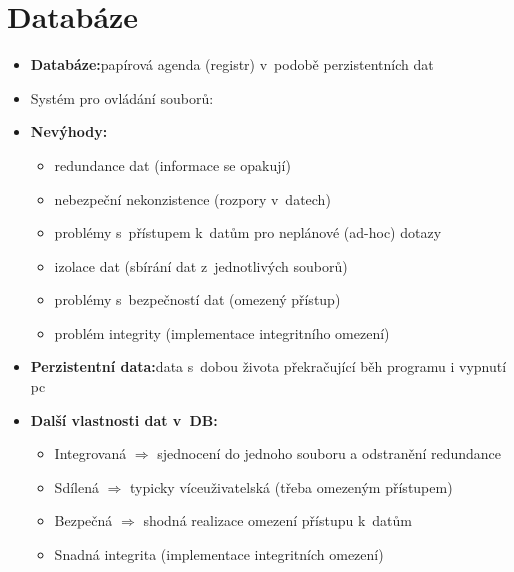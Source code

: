 \documentclass[a4paper,10pt]{article}
\newcommand{\pojem}[2]{\item \textbf{#1:}\quad #2}
\newcommand{\tedy}{$\Rightarrow$ }
\begin{document}
  \section{Databáze}
    \begin{itemize}
      \pojem{Databáze}{papírová agenda (registr) v~podobě perzistentních dat}
      \item Systém pro ovládání souborů:
      \pojem{Nevýhody}
      \begin{itemize}
        \item redundance dat (informace se opakují)
        \item nebezpeční nekonzistence (rozpory v~datech)
        \item problémy s~přístupem k~datům pro neplánové (ad-hoc) dotazy
        \item izolace dat (sbírání dat z~jednotlivých souborů)
        \item problémy s~bezpečností dat (omezený přístup)
        \item problém integrity (implementace integritního omezení)
      \end{itemize}

      \pojem{Perzistentní data}{data s~dobou života překračující běh programu i vypnutí pc}
      \pojem{Další vlastnosti dat v~DB}
      \begin{itemize}
        \item Integrovaná \tedy sjednocení do jednoho souboru a odstranění redundance
        \item Sdílená \tedy typicky víceuživatelská (třeba omezeným přístupem)
        \item Bezpečná \tedy shodná realizace omezení přístupu k~datům
        \item Snadná integrita (implementace integritních omezení)
      \end{itemize}


\end{itemize}
\end{document}
